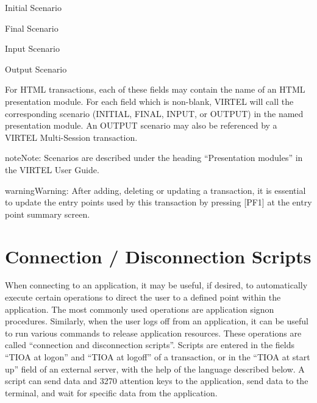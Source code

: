 \documentclass[letterpaper,10pt,english]{sphinxmanual}
\begin{document}
Initial Scenario

Final Scenario

Input Scenario

Output Scenario

For HTML transactions, each of these fields may contain the name of an HTML presentation module. For each field which is non-blank, VIRTEL will call the corresponding scenario (INITIAL, FINAL, INPUT, or OUTPUT) in the named presentation module. An OUTPUT scenario may also be referenced by a VIRTEL Multi-Session transaction.

\begin{sphinxadmonition}{note}{Note:}
Scenarios are described under the heading “Presentation modules” in the VIRTEL User Guide.
\end{sphinxadmonition}

\begin{sphinxadmonition}{warning}{Warning:}
After adding, deleting or updating a transaction, it is essential to update the entry points used by this transaction by pressing {[}PF1{]} at the entry point summary screen.
\end{sphinxadmonition}


\chapter{Connection / Disconnection Scripts}
\label{\detokenize{connectivity_guide:connection-disconnection-scripts}}\label{\detokenize{connectivity_guide:index-116}}
When connecting to an application, it may be useful, if desired, to automatically execute certain operations to direct the user to a defined point within the application. The most commonly used operations are application signon procedures. Similarly, when the user logs off from an application, it can be useful to run various commands to release application resources. These operations are called “connection and disconnection scripts”. Scripts are entered in the fields “TIOA at logon” and “TIOA at logoff” of a transaction, or in the “TIOA at start up” field of an external server, with the help of the language described below. A script can send data and 3270 attention keys to the application, send data to the terminal, and wait for specific data from the application.

\end{document}
